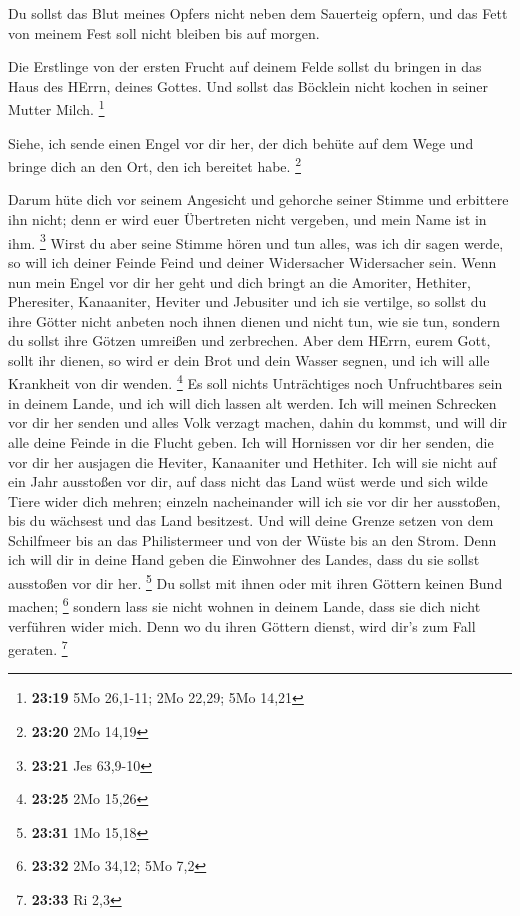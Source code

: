  Du sollst das Blut meines Opfers nicht neben dem Sauerteig
opfern, und das Fett von meinem Fest soll nicht bleiben bis auf morgen.

 Die Erstlinge von der ersten Frucht auf deinem Felde
sollst du bringen in das Haus des HErrn, deines Gottes. Und sollst das
Böcklein nicht kochen in seiner Mutter Milch. \footnote{\textbf{23:19}
  5Mo 26,1-11; 2Mo 22,29; 5Mo 14,21}

 Siehe, ich sende einen Engel vor dir her, der dich behüte
auf dem Wege und bringe dich an den Ort, den ich bereitet habe.
\footnote{\textbf{23:20} 2Mo 14,19}

 Darum hüte dich vor seinem Angesicht und gehorche seiner
Stimme und erbittere ihn nicht; denn er wird euer Übertreten nicht
vergeben, und mein Name ist in ihm. \footnote{\textbf{23:21} Jes 63,9-10}
 Wirst du aber seine Stimme hören und tun alles, was ich
dir sagen werde, so will ich deiner Feinde Feind und deiner Widersacher
Widersacher sein.  Wenn nun mein Engel vor dir her geht und
dich bringt an die Amoriter, Hethiter, Pheresiter, Kanaaniter, Heviter
und Jebusiter und ich sie vertilge,  so sollst du ihre
Götter nicht anbeten noch ihnen dienen und nicht tun, wie sie tun,
sondern du sollst ihre Götzen umreißen und zerbrechen. 
Aber dem HErrn, eurem Gott, sollt ihr dienen, so wird er dein Brot und
dein Wasser segnen, und ich will alle Krankheit von dir wenden.
\footnote{\textbf{23:25} 2Mo 15,26}  Es soll nichts
Unträchtiges noch Unfruchtbares sein in deinem Lande, und ich will dich
lassen alt werden.  Ich will meinen Schrecken vor dir her
senden und alles Volk verzagt machen, dahin du kommst, und will dir alle
deine Feinde in die Flucht geben.  Ich will Hornissen vor
dir her senden, die vor dir her ausjagen die Heviter, Kanaaniter und
Hethiter.  Ich will sie nicht auf ein Jahr ausstoßen vor
dir, auf dass nicht das Land wüst werde und sich wilde Tiere wider dich
mehren;  einzeln nacheinander will ich sie vor dir her
ausstoßen, bis du wächsest und das Land besitzest.  Und
will deine Grenze setzen von dem Schilfmeer bis an das Philistermeer und
von der Wüste bis an den Strom. Denn ich will dir in deine Hand geben
die Einwohner des Landes, dass du sie sollst ausstoßen vor dir her.
\footnote{\textbf{23:31} 1Mo 15,18}  Du sollst mit ihnen
oder mit ihren Göttern keinen Bund machen; \footnote{\textbf{23:32} 2Mo
  34,12; 5Mo 7,2}  sondern lass sie nicht wohnen in deinem
Lande, dass sie dich nicht verführen wider mich. Denn wo du ihren
Göttern dienst, wird dir's zum Fall geraten. \footnote{\textbf{23:33} Ri
  2,3}

